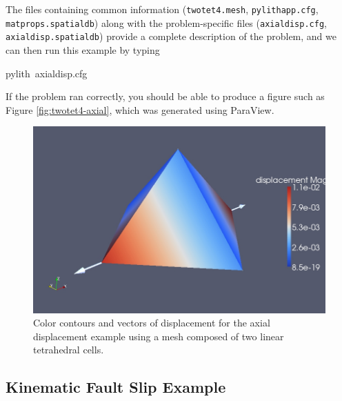 The files containing common information (\texttt{twotet4.mesh}, \texttt{pylithapp.cfg},
\texttt{matprops.spatialdb}) along with the problem-specific files
(\texttt{axialdisp.cfg}, \texttt{axialdisp.spatialdb}) provide a complete
description of the problem, and we can then run this example by typing
\begin{lyxcode}
pylith~axialdisp.cfg
\end{lyxcode}
If the problem ran correctly, you should be able to produce a figure
such as Figure \vref{fig:twotet4-axial}, which was generated using
ParaView.

\begin{figure}
\begin{centering}
\includegraphics[scale=0.33]{tutorials/twocells/figs/twotet4-axialdisp}
\par\end{centering}

\caption{Color contours and vectors of displacement for the axial displacement
example using a mesh composed of two linear tetrahedral cells.\label{fig:twotet4-axial}}
\end{figure}



\subsection{Kinematic Fault Slip Example}

